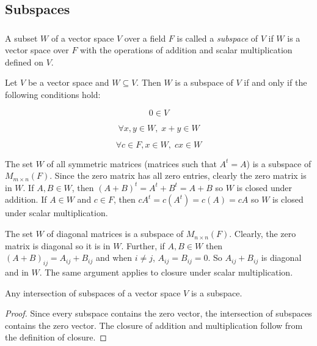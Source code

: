 
\subsection{Subspaces}

\subsubsection*{}

\begin{definition}
		A subset \(W\) of a vector space \(V\) over a field \(F\) is called a \textit{subspace} of \(V\) if \(W\) is a vector space over \(F\) with the operations of addition and scalar multiplication defined on \(V\).

\end{definition}


\begin{theorem}
		Let \(V\) be a vector space and \(W \subseteq V\). Then \(W\) is a subspace of \(V\) if and only if the following conditions hold:

\[
0 \in V
\]

\[
\forall x, y \in W, \; x + y \in W
\]

\[
\forall c \in F, x \in W, \; cx \in W
\]

\end{theorem}


\begin{example}
		The set \(W\) of all symmetric matrices (matrices such that \(A^{t} = A\)) is a subspace of \(M_{m\times n}(F)\). Since the zero matrix has all zero entries, clearly the zero matrix is in \(W\). If \(A,B\in W\), then \((A+B)^{t} = A^{t}+B^{t} = A+B\) so \(W\) is closed under addition. If \(A\in W\) and \(c\in F\), then \(cA^{t} = c(A^{t}) = c(A) = cA\) so \(W\) is closed under scalar multiplication.

\end{example}


\begin{example}
		The set \(W\) of diagonal matrices is a subspace of \(M_{n \times n}(F)\). Clearly, the zero matrix is diagonal so it is in \(W\). Further, if \(A,B\in W\) then \((A+B)_{ij} = A_{ij}+B_{ij}\) and when \(i\not = j\), \(A_{ij} = B_{ij} = 0\). So \(A_{ij}+B_{ij}\) is diagonal and in \(W\). The same argument applies to closure under scalar multiplication.

\end{example}


\begin{theorem}
		Any intersection of subspaces of a vector space \(V\) is a subspace.

\begin{proof}
			Since every subspace contains the zero vector, the intersection of subspaces contains the zero vector. The closure of addition and multiplication follow from the definition of closure.

\end{proof}

\end{theorem}

